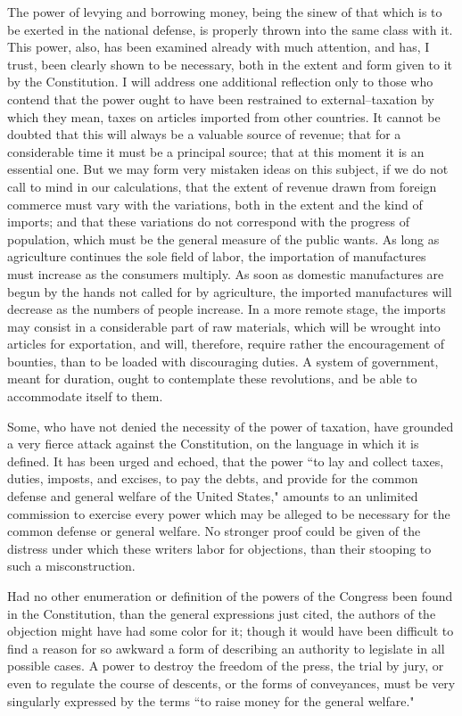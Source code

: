 The power of levying and borrowing money, being the sinew of that which is to be exerted in the national defense, is properly thrown into the same class with it. This power, also, has been examined already with much attention, and has, I trust, been clearly shown to be necessary, both in the extent and form given to it by the Constitution. I will address one additional reflection only to those who contend that the power ought to have been restrained to external--taxation by which they mean, taxes on articles imported from other countries. It cannot be doubted that this will always be a valuable source of revenue; that for a considerable time it must be a principal source; that at this moment it is an essential one. But we may form very mistaken ideas on this subject, if we do not call to mind in our calculations, that the extent of revenue drawn from foreign commerce must vary with the variations, both in the extent and the kind of imports; and that these variations do not correspond with the progress of population, which must be the general measure of the public wants. As long as agriculture continues the sole field of labor, the importation of manufactures must increase as the consumers multiply. As soon as domestic manufactures are begun by the hands not called for by agriculture, the imported manufactures will decrease as the numbers of people increase. In a more remote stage, the imports may consist in a considerable part of raw materials, which will be wrought into articles for exportation, and will, therefore, require rather the encouragement of bounties, than to be loaded with discouraging duties. A system of government, meant for duration, ought to contemplate these revolutions, and be able to accommodate itself to them.

Some, who have not denied the necessity of the power of taxation, have grounded a very fierce attack against the Constitution, on the language in which it is defined. It has been urged and echoed, that the power ``to lay and collect taxes, duties, imposts, and excises, to pay the debts, and provide for the common defense and general welfare of the United States," amounts to an unlimited commission to exercise every power which may be alleged to be necessary for the common defense or general welfare. No stronger proof could be given of the distress under which these writers labor for objections, than their stooping to such a misconstruction.

Had no other enumeration or definition of the powers of the Congress been found in the Constitution, than the general expressions just cited, the authors of the objection might have had some color for it; though it would have been difficult to find a reason for so awkward a form of describing an authority to legislate in all possible cases. A power to destroy the freedom of the press, the trial by jury, or even to regulate the course of descents, or the forms of conveyances, must be very singularly expressed by the terms ``to raise money for the general welfare."

